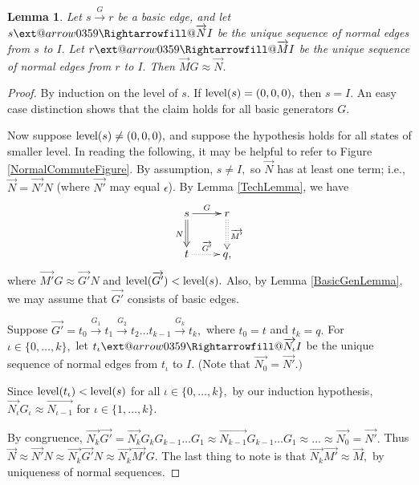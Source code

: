 \documentclass{dalthesis}
\makeatletter
\theoremstyle{theorem}
\newtheorem{lemma}[theorem]{Lemma}
\theoremstyle{definition}
\theoremstyle{definition}  %
\theoremstyle{definition}
\newcommand{\kay}{k}
\renewcommand{\:}{\mathbin{:}}
\newcommand{\xRightarrow}[2][]{\ext@arrow
  0359\Rightarrowfill@{#1}{#2}}
\newcommand{\level}{\mathop{\rm level}\nolimits}
\newcommand{\edge}{\xrightarrow}
\newcommand{\nedge}{\xRightarrow}
\renewcommand{\vec}{\overrightarrow}
\makeatother
\begin{document}
\begin{lemma}
\label{NormalCommuteLemma}
Let $s\edge{G}r$ be a basic edge, and let $s\nedge{\vec{N}}I$ be the unique sequence of normal edges from $s$ to $I.$ Let $r\nedge{\vec{M}}I$ be the unique sequence of normal edges from $r$ to $I.$ Then $\vec{M}G\approx\vec{N}.$
\end{lemma}
\begin{proof}
By induction on the level of $s.$ If $\level(s) = (0,0,0),$ then $s = I.$ An easy case distinction shows that the claim holds for all basic generators $G.$

Now suppose $\level(s)\neq(0,0,0),$ and suppose the hypothesis holds for all states of smaller level. In reading the following, it may be helpful to refer to Figure \ref{NormalCommuteFigure}. By assumption, $s\neq I,$ so $\vec{N}$ has at least one term; i.e., $\vec{N} = \vec{N'}N$ (where $\vec{N'}$ may equal $\epsilon$).  By Lemma \ref{TechLemma}, we have\[ \xymatrix{
    s \ar@{=>}[d]_{N} \ar[r]^{G} &
    r \ar@{:>}[d]^{\vec{M'}} \\
    t \ar@{.>}[r]^{\vec{G'}} &
    q,
  }
  \]
  where $\vec{M'}G\approx\vec{G'}N$ and $\level(\vec{G'})<\level(s).$ Also, by Lemma \ref{BasicGenLemma}, we may assume that $\vec{G'}$ consists of basic edges.
  
  Suppose $\vec{G'} = t_0\edge{G_1}t_1\edge{G_2}t_2\ldots t_{\kay-1}\edge{G_{\kay}}t_{\kay},$ where $t_0 = t$ and $t_{\kay} = q.$ For $\iota\in\{0,\ldots ,\kay\},$ let $t_\iota\nedge{\vec{N_\iota}}I$ be the unique sequence of normal edges from $t_\iota$ to $I.$ (Note that $\vec{N_0} = \vec{N'}.)$
  
  Since $\level(t_\iota)<\level(s)$ for all $\iota\in\{0,\ldots ,\kay\},$ by our induction hypothesis, $\vec{N_\iota}G_\iota\approx\vec{N_{\iota-1}}$ for $\iota\in\{1,\ldots ,\kay\}.$ 
  
By congruence, $\vec{N_{\kay}}\vec{G'} = \vec{N_{\kay}}G_{\kay}G_{\kay-1}\ldots G_1\approx\vec{N_{\kay-1}}G_{\kay-1}\ldots G_1\approx\ldots \approx\vec{N_0} = \vec{N'}.$ Thus $\vec{N}\approx\vec{N'}N\approx\vec{N_{\kay}}\vec{G'}N\approx\vec{N_{\kay}}\vec{M'}G.$ The last thing to note is that $\vec{N_{\kay}}\vec{M'}\approx\vec{M},$ by uniqueness of normal sequences. 
\end{proof}
\end{document}
